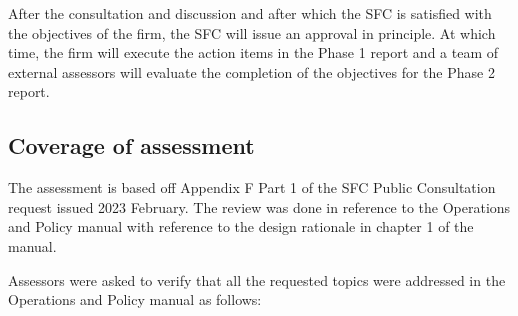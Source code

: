 \documentclass[]{report}
\begin{document}
After the consultation and discussion and after which the SFC is
satisfied with the objectives of the firm, the SFC will issue an
approval in principle.  At which time, the firm will execute the
action items in the Phase 1 report and a team of external assessors
will evaluate the completion of the objectives for the Phase 2 report.

\subsection{Coverage of assessment}
The assessment is based off Appendix F Part 1 of the SFC Public
Consultation request issued 2023 February.  The review was done in
reference to the Operations and Policy manual with reference to the
design rationale in chapter 1 of the manual.


Assessors were asked to
verify that all the requested topics were addressed in the
Operations and Policy manual as follows:
\end{document}

